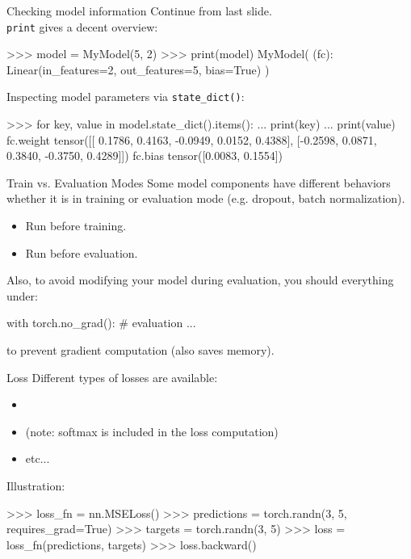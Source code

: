 \begin{frame}[fragile]{Checking model information}
\pause
\vspace{-6mm}
Continue from last slide.\\
\texttt{print} gives a decent overview:
\begin{python}
>>> model = MyModel(5, 2)
>>> print(model)
MyModel(
  (fc): Linear(in_features=2, out_features=5, bias=True)
)
\end{python}
\pause
Inspecting model parameters via \texttt{state\_dict()}:
\begin{python}
>>> for key, value in model.state_dict().items():
...    print(key)
...    print(value)
fc.weight
tensor([[ 0.1786,  0.4163, -0.0949,  0.0152,  0.4388],
        [-0.2598,  0.0871,  0.3840, -0.3750,  0.4289]])
fc.bias
tensor([0.0083, 0.1554])
\end{python}
\end{frame}

\begin{frame}[fragile]{Train vs. Evaluation Modes}
Some model components have different behaviors whether
it is in training or evaluation mode (e.g. dropout, batch normalization).
\pause
\vsp
\begin{itemize}
\item Run  before training.
\item Run  before evaluation. 
\end{itemize}
\vsp
\pause
Also, to avoid modifying your model during evaluation,
you should everything under:
\begin{python}
with torch.no_grad():
    # evaluation
    ...
\end{python}
to prevent gradient computation (also saves memory).
\end{frame}

\begin{frame}[fragile]{Loss}
Different types of losses are available:
\begin{itemize}
\item {}
\item {} (note: softmax is included in the loss computation)
\item etc...
\end{itemize}
\vsp
Illustration:
\begin{python}
>>> loss_fn = nn.MSELoss()
>>> predictions = torch.randn(3, 5, requires_grad=True)
>>> targets = torch.randn(3, 5)
>>> loss = loss_fn(predictions, targets)
>>> loss.backward()
\end{python}
\end{frame}

